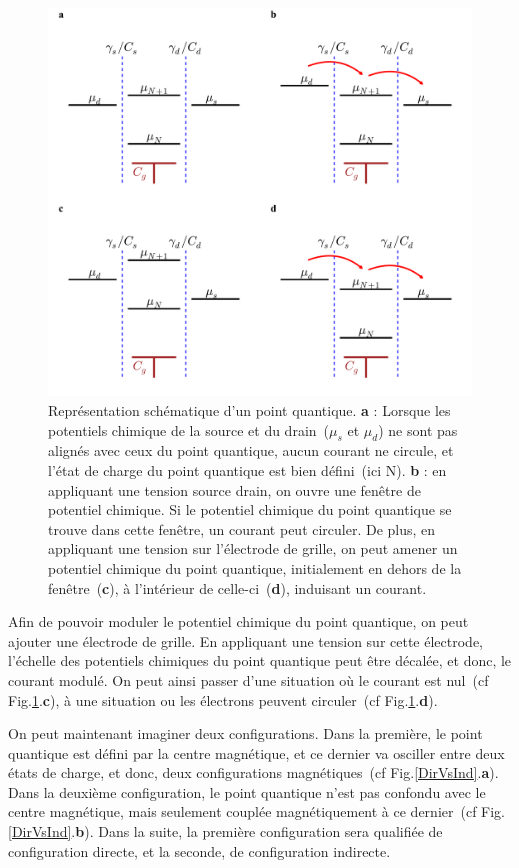 \begin{figure}
\centering \includegraphics[scale=0.45]{Resultats/DotSchem/DotSchem.pdf} 
\caption{Représentation schématique d'un point quantique. \textbf{a} : Lorsque les potentiels chimique de la source et du drain~($\mu_s$ et $\mu_d$) ne sont pas alignés avec ceux du point quantique, aucun courant ne circule, et l'état de charge du point quantique est bien défini~(ici N). \textbf{b} : en appliquant une tension source drain, on ouvre une fenêtre de potentiel chimique. Si le potentiel chimique du point quantique se trouve dans cette fenêtre, un courant peut circuler. De plus, en appliquant une tension sur l'électrode de grille, on peut amener un potentiel chimique du point quantique, initialement en dehors de la fenêtre~(\textbf{c}), à l'intérieur de celle-ci~(\textbf{d}), induisant un courant.}
\label{DotSchem}
\end{figure}


Afin de pouvoir moduler le potentiel chimique du point quantique, on peut ajouter une électrode de grille. En appliquant une tension sur cette électrode, l'échelle des potentiels chimiques du point quantique peut être décalée, et donc, le courant modulé. On peut ainsi passer d'une situation où le courant est nul~(cf Fig.\ref{DotSchem}.\textbf{c}), à une situation ou les électrons peuvent circuler~(cf Fig.\ref{DotSchem}.\textbf{d}).

On peut maintenant imaginer deux configurations. Dans la première, le point quantique est défini par la centre magnétique, et ce dernier va osciller entre deux états de charge, et donc, deux configurations magnétiques~(cf Fig.\ref{DirVsInd}.\textbf{a}). 
Dans la deuxième configuration, le point quantique n'est pas confondu avec le centre magnétique, mais seulement couplée magnétiquement à ce dernier~(cf Fig.\ref{DirVsInd}.\textbf{b}). Dans la suite, la première configuration sera qualifiée de configuration directe, et la seconde, de configuration indirecte.


